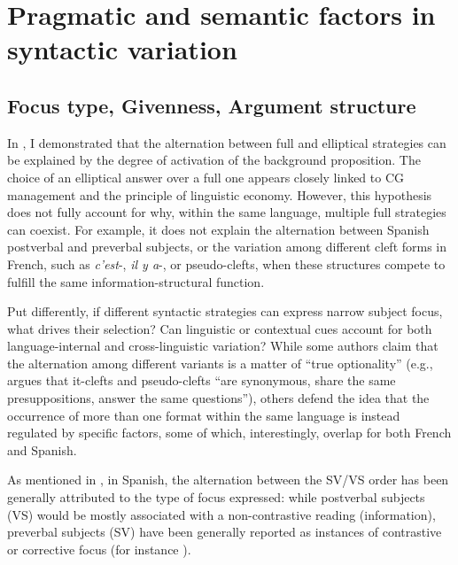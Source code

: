 \chapter{Pragmatic and semantic factors in syntactic variation}\label{sec:5}
\section{Focus type, Givenness, Argument structure} \label{sub:6.1}

In , I demonstrated that the alternation between full and elliptical strategies can be explained by the degree of activation of the background proposition. The choice of an elliptical answer over a full one appears closely linked to CG management and the principle of linguistic economy. However, this hypothesis does not fully account for why, within the same language, multiple full strategies can coexist. For example, it does not explain the alternation between Spanish postverbal and preverbal subjects, or the variation among different cleft forms in French, such as \textit{c’est}-, \textit{il y a}-, or pseudo-clefts, when these structures compete to fulfill the same information-structural function. 

Put differently, if different syntactic strategies can express narrow subject focus, what drives their selection? Can linguistic or contextual cues account for both language-internal and cross-linguistic variation?
While some authors claim that the alternation among different variants is a matter of ``true optionality” (e.g., \cite[149]{akmajian1970deriving} argues that it-clefts and pseudo-clefts “are synonymous, share the same presuppositions,  answer  the  same questions”), others defend the idea that the occurrence of more than one format within the same language is instead regulated by specific factors, some of which, interestingly,  overlap for both French and Spanish.

As mentioned in , in Spanish, the alternation between the SV/VS order has been generally attributed to the type of focus expressed: while postverbal subjects (VS) would be mostly associated with a non-contrastive reading (information), preverbal subjects (SV) have been generally reported as instances of contrastive or corrective focus (for instance \cite{zubizarreta1998prosody, costa2001postverbal, gutierrez2013structural}). 

